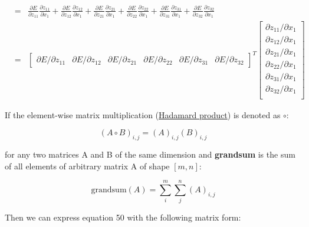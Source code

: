 \documentclass{article}
\begin{document}
\begin{eqnarray}
& = &
\frac{\partial{E}}{\partial{z_{11}}}\frac{\partial{z_{11}}}{\partial{x_1}} +
\frac{\partial{E}}{\partial{z_{12}}}\frac{\partial{z_{12}}}{\partial{x_1}} +
\frac{\partial{E}}{\partial{z_{21}}}\frac{\partial{z_{21}}}{\partial{x_1}} +
\frac{\partial{E}}{\partial{z_{22}}}\frac{\partial{z_{22}}}{\partial{x_1}} +
\frac{\partial{E}}{\partial{z_{31}}}\frac{\partial{z_{31}}}{\partial{x_1}} +
\frac{\partial{E}}{\partial{z_{32}}}\frac{\partial{z_{32}}}{\partial{x_1}} \nonumber \\
& = &
\left[\begin{array}{cccccc}
\partial{E} / \partial{z_{11}} & \partial{E} / \partial{z_{12}} &
\partial{E} / \partial{z_{21}} & \partial{E} / \partial{z_{22}} &
\partial{E} / \partial{z_{31}} & \partial{E} / \partial{z_{32}}
\end{array}
\right]^T
\left[\begin{array}{c}
\partial{z_{11}} / \partial{x_1} \\
\partial{z_{12}} / \partial{x_1} \\
\partial{z_{21}} / \partial{x_1} \\
\partial{z_{22}} / \partial{x_1} \\
\partial{z_{31}} / \partial{x_1} \\
\partial{z_{32}} / \partial{x_1} \\
\end{array}
\right]
\end{eqnarray}

If the element-wise matrix multiplication 
(\href{https://en.wikipedia.org/wiki/Hadamard_product_(matrices)}{Hadamard product}) is 
denoted as $\circ$:

\begin{equation}
(A \circ B)_{i,j} = (A)_{i,j}(B)_{i,j}
\end{equation}

\noindent for any two matrices A and B of the same dimension and \textbf{grandsum} is the
sum of all elements of arbitrary matrix A of shape $[m, n]$: 

\begin{equation}
	\mathrm{grandsum}(A) = \sum_{i}^{m}{\sum_{j}^{n}{(A)_{i, j}}}
\end{equation}

\noindent Then we can express equation 50 with the following matrix form:
\end{document}
